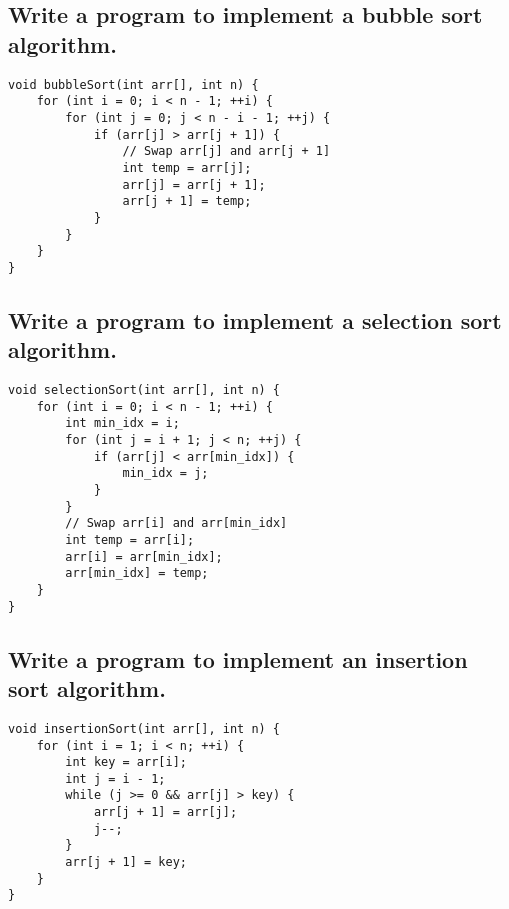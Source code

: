 \subsection{Write a program to implement a bubble sort algorithm.}
\begin{tcolorbox}[title=]
\begin{verbatim}
void bubbleSort(int arr[], int n) {
    for (int i = 0; i < n - 1; ++i) {
        for (int j = 0; j < n - i - 1; ++j) {
            if (arr[j] > arr[j + 1]) {
                // Swap arr[j] and arr[j + 1]
                int temp = arr[j];
                arr[j] = arr[j + 1];
                arr[j + 1] = temp;
            }
        }
    }
}
\end{verbatim}
\end{tcolorbox}

\subsection{Write a program to implement a selection sort algorithm.}
\begin{tcolorbox}[title=]
\begin{verbatim}
void selectionSort(int arr[], int n) {
    for (int i = 0; i < n - 1; ++i) {
        int min_idx = i;
        for (int j = i + 1; j < n; ++j) {
            if (arr[j] < arr[min_idx]) {
                min_idx = j;
            }
        }
        // Swap arr[i] and arr[min_idx]
        int temp = arr[i];
        arr[i] = arr[min_idx];
        arr[min_idx] = temp;
    }
}
\end{verbatim}
\end{tcolorbox}

\subsection{Write a program to implement an insertion sort algorithm.}
\begin{tcolorbox}[title=]
\begin{verbatim}
void insertionSort(int arr[], int n) {
    for (int i = 1; i < n; ++i) {
        int key = arr[i];
        int j = i - 1;
        while (j >= 0 && arr[j] > key) {
            arr[j + 1] = arr[j];
            j--;
        }
        arr[j + 1] = key;
    }
}
\end{verbatim}
\end{tcolorbox}

